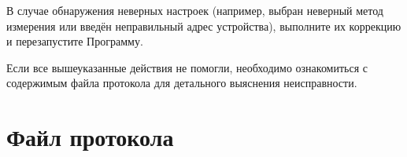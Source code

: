 \documentclass[12pt, a4paper, twocolumn]{report}
\begin{document}
В случае обнаружения неверных настроек (например, выбран неверный метод измерения или введён неправильный адрес устройства), выполните их коррекцию и перезапустите Программу.

Если все вышеуказанные действия не помогли, необходимо ознакомиться с содержимым файла протокола для детального выяснения неисправности.

\section{Файл протокола}


\end{document}
